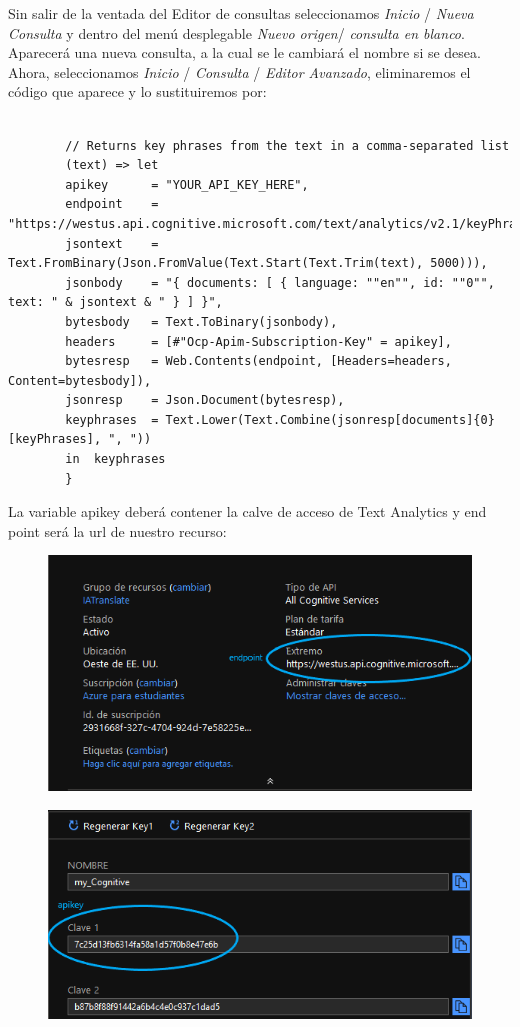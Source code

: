 \documentclass[english,runningheads,a4paper]{llncs}[2018/03/10]
\begin{document}
    Sin salir de la ventada del Editor de consultas seleccionamos 
    \textit{Inicio} / \textit{Nueva Consulta} y dentro del menú desplegable 
    \textit{Nuevo origen}/ \textit{consulta en blanco}. Aparecerá una nueva 
    consulta, a la cual se le cambiará el nombre si se desea.
    Ahora, seleccionamos \textit{Inicio} / \textit{Consulta} / 
    \textit{Editor Avanzado}, eliminaremos el código que aparece y lo 
    sustituiremos por:
    \small{
        \begin{verbatim}
        
        // Returns key phrases from the text in a comma-separated list
        (text) => let
        apikey      = "YOUR_API_KEY_HERE",
        endpoint    = "https://westus.api.cognitive.microsoft.com/text/analytics/v2.1/keyPhrases",
        jsontext    = Text.FromBinary(Json.FromValue(Text.Start(Text.Trim(text), 5000))),
        jsonbody    = "{ documents: [ { language: ""en"", id: ""0"", text: " & jsontext & " } ] }",
        bytesbody   = Text.ToBinary(jsonbody),
        headers     = [#"Ocp-Apim-Subscription-Key" = apikey],
        bytesresp   = Web.Contents(endpoint, [Headers=headers, Content=bytesbody]),
        jsonresp    = Json.Document(bytesresp),
        keyphrases  = Text.Lower(Text.Combine(jsonresp[documents]{0}[keyPhrases], ", "))
        in  keyphrases
        }
        \end{verbatim}
    }
    La variable apikey deberá contener la calve de acceso de Text Analytics y 
    end point será la url de nuestro recurso: 
    \begin{figure}[H]
        \centering
        \includegraphics[scale=0.25]{./IA/AZURE/infoCog.png}
    \end{figure}
    \begin{figure}[H]
        \centering
        \includegraphics[scale=0.25]{./IA/AZURE/keyconf.png}
    \end{figure}
    
\end{document}
